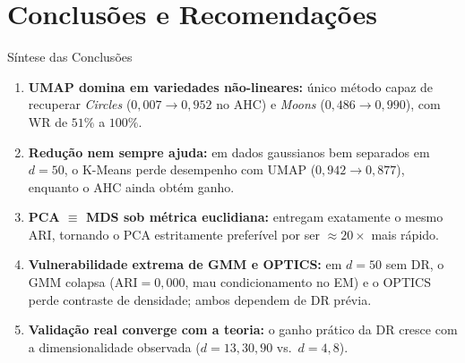 \documentclass[aspectratio=169,11pt]{beamer}
\begin{document}
\section{Conclusões e Recomendações}

\begin{frame}{Síntese das Conclusões}
  \small
  \begin{enumerate}
    \item \textbf{UMAP domina em variedades não-lineares:} único método capaz de recuperar \textit{Circles} ($0{,}007 \to 0{,}952$ no AHC) e \textit{Moons} ($0{,}486 \to 0{,}990$), com WR de $51\%$ a $100\%$.
    \item \textbf{Redução nem sempre ajuda:} em dados gaussianos bem separados em $d=50$, o K-Means perde desempenho com UMAP ($0{,}942 \to 0{,}877$), enquanto o AHC ainda obtém ganho.
    \item \textbf{PCA $\equiv$ MDS sob métrica euclidiana:} entregam exatamente o mesmo ARI, tornando o PCA estritamente preferível por ser $\approx 20\times$ mais rápido.
    \item \textbf{Vulnerabilidade extrema de GMM e OPTICS:} em $d=50$ sem DR, o GMM colapsa ($\text{ARI}=0{,}000$, mau condicionamento no EM) e o OPTICS perde contraste de densidade; ambos dependem de DR prévia.
    \item \textbf{Validação real converge com a teoria:} o ganho prático da DR cresce com a dimensionalidade observada ($d=13, 30, 90$ vs.\ $d=4, 8$).
  \end{enumerate}
\end{frame}
\end{document}
